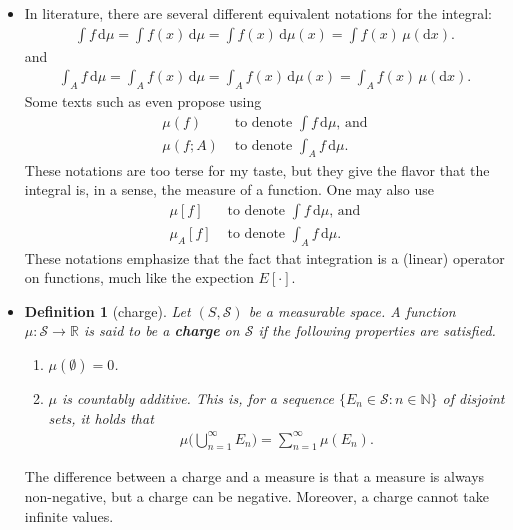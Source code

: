 \documentclass[10pt]{article}
\newtheorem{definition}[lemma]{Definition}
\newtheorem{proposition}[lemma]{Proposition}
\numberwithin{lemma}{section}
\newcommand{\dee}{\mathrm{d}}
\newcommand{\mcal}[1]{\mathcal{#1}}
\newcommand{\Real}{\mathbb{R}}
\newcommand{\Nat}{\mathbb{N}}
\begin{document}
\begin{itemize}
\begin{proposition}[linearity of Lebesgue integral]
\begin{enumerate}
      \item $\int f+g\, \dee\mu = \int f\, \dee\mu + \int g\, \dee\mu.$      
    \end{enumerate}
  \end{proposition}

  \item In literature, there are several different equivalent notations for the integral:
  \begin{align*}
    \int f\, \dee\mu = \int f(x)\, \dee\mu = \int f(x)\,\dee\mu(x) = \int f(x)\, \mu(\dee x).
  \end{align*}
  and 
  \begin{align*}
    \int_A f\, \dee\mu = \int_A f(x)\, \dee\mu = \int_A f(x)\,\dee\mu(x) = \int_A f(x)\, \mu(\dee x).
  \end{align*}
  Some texts such as \cite{Williams:1991} even propose using 
  \begin{align*}
    \mu(f) &\mbox{ to denote } \int f\, \dee\mu\mbox{, and}\\
    \mu(f;A) &\mbox{ to denote }\int_A f\,\dee\mu.
  \end{align*}
  These notations are too terse for my taste, but they give the flavor that the integral is, in a sense, the measure of a function. One may also use
  \begin{align*}
    \mu[f] &\mbox{ to denote } \int f\, \dee\mu\mbox{, and}\\
    \mu_A[f] &\mbox{ to denote }\int_A f\,\dee\mu.
  \end{align*}
  These notations emphasize that the fact that integration is a (linear) operator on functions, much like the expection $E[\cdot]$.
  
  \item \begin{definition}[charge]
    Let $(S,\mcal{S})$ be a measurable space. A function $\mu: \mcal{S} \rightarrow \Real$ is said to be a {\bf charge} on $\mcal{S}$ if the following properties are satisfied.
    \begin{enumerate}
      \item $\mu(\emptyset) = 0$.
      \item $\mu$ is countably additive. This is, for a sequence $\{E_n \in \mcal{S}: n \in \Nat\}$ of disjoint sets, it holds that
      \begin{align*}
        \mu\bigg( \bigcup_{n=1}^\infty E_n \bigg) = \sum_{n=1}^\infty \mu(E_n).
      \end{align*}
    \end{enumerate}
  \end{definition}
  The difference between a charge and a measure is that a measure is always non-negative, but a charge can be negative. Moreover, a charge cannot take infinite values.


\end{itemize}
\end{document}
